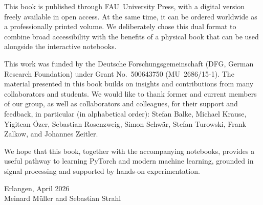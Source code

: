 {This book is published through FAU~University Press, with a digital version freely available in open access. At the same time, it can be ordered worldwide as a professionally printed volume. We deliberately chose this dual format to combine broad accessibility with the benefits of a physical book that can be used alongside the interactive notebooks.

This work was funded by the Deutsche Forschungsgemeinschaft (DFG, German Research Foundation) under Grant No.~500643750 (MU~2686/15-1). The material presented in this book builds on insights and contributions from many collaborators and students. We would like to thank former and current members of our group, as well as collaborators and colleagues, for their support and feedback, in particular (in alphabetical order): Stefan Balke, Michael Krause, Yigitcan Özer, Sebastian Rosenzweig, Simon Schwär, Stefan Turowski, Frank Zalkow, and Johannes Zeitler.

We hope that this book, together with the accompanying notebooks, provides a useful pathway to learning PyTorch and modern machine learning, grounded in signal processing and supported by hands-on experimentation.

\vspace{2em}

\noindent
Erlangen, April 2026\\
Meinard Müller and Sebastian Strahl
}